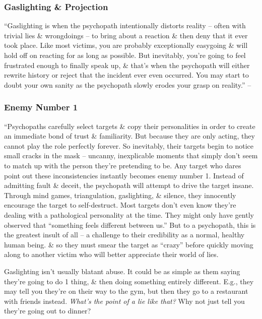 \documentclass{article}
\numberwithin{equation}{section}
\begin{document}
\subsubsection{Gaslighting \& Projection}
``Gaslighting is when the psychopath intentionally distorts reality -- often with trivial lies \& wrongdoings -- to bring about a reaction \& then deny that it ever took place. Like most victims, you are probably exceptionally easygoing \& will hold off on reacting for as long as possible. But inevitably, you're going to feel frustrated enough to finally speak up, \& that's when the psychopath will either rewrite history or reject that the incident ever even occurred. You may start to doubt your own sanity as the psychopath slowly erodes your grasp on reality.'' -- \cite[p. 46]{MacKenzie2015}

\subsubsection{Enemy Number 1}
``Psychopaths carefully select targets \& copy their personalities in order to create an immediate bond of trust \& familiarity. But because they are only acting, they cannot play the role perfectly forever. So inevitably, their targets begin to notice small cracks in the mask -- uncanny, inexplicable moments that simply don't seem to match up with the person they're pretending to be. Any target who dares point out these inconsistencies instantly becomes enemy number 1. Instead of admitting fault \& deceit, the psychopath will attempt to drive the target insane. Through mind games, triangulation, gaslighting, \& silence, they innocently encourage the target to self-destruct. Most targets don't even know they're dealing with a pathological personality at the time. They might only have gently observed that ``something feels different between us.'' But to a psychopath, this is the greatest insult of all -- a challenge to their credibility as a normal, healthy human being. \& so they must smear the target as ``crazy'' before quickly moving along to another victim who will better appreciate their world of lies.

Gaslighting isn't usually blatant abuse. It could be as simple as them saying they're going to do 1 thing, \& then doing something entirely different. E.g., they may tell you they're on their way to the gym, but then they go to a restaurant with friends instead. \textit{What's the point of a lie like that?} Why not just tell you they're going out to dinner?
\end{document}
